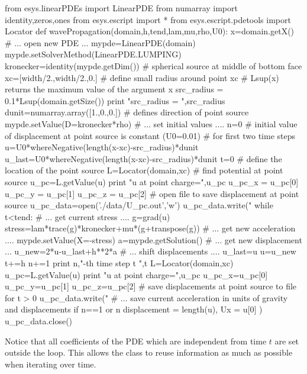 \begin{python}
from esys.linearPDEs import LinearPDE
from numarray import identity,zeros,ones
from esys.escript import *
from esys.escript.pdetools import Locator
def wavePropagation(domain,h,tend,lam,mu,rho,U0):
   x=domain.getX()
   # ... open new PDE ...
   mypde=LinearPDE(domain)
   mypde.setSolverMethod(LinearPDE.LUMPING)
   kronecker=identity(mypde.getDim())
   #  spherical source at middle of bottom face
   xc=[width/2.,width/2.,0.] 
   # define small radius around point xc
   # Lsup(x) returns the maximum value of the argument x
   src_radius = 0.1*Lsup(domain.getSize())
   print "src_radius = ",src_radius
   dunit=numarray.array([1.,0.,0.]) # defines direction of point source
   mypde.setValue(D=kronecker*rho)
   # ... set initial values ....
   n=0
   # initial value of displacement at point source is constant (U0=0.01)
   # for first two time steps
   u=U0*whereNegative(length(x-xc)-src_radius)*dunit
   u_last=U0*whereNegative(length(x-xc)-src_radius)*dunit
   t=0
   # define the location of the point source
   L=Locator(domain,xc)
   # find potential at point source
   u_pc=L.getValue(u)
   print "u at point charge=",u_pc
   u_pc_x = u_pc[0]
   u_pc_y = u_pc[1]
   u_pc_z = u_pc[2]
   # open file to save displacement at point source
   u_pc_data=open('./data/U_pc.out','w')
   u_pc_data.write("%
   while t<tend:
     # ... get current stress ....
     g=grad(u)
     stress=lam*trace(g)*kronecker+mu*(g+transpose(g))
     # ... get new acceleration ....
     mypde.setValue(X=-stress)
     a=mypde.getSolution()
     # ... get new displacement ...
     u_new=2*u-u_last+h**2*a
     # ... shift displacements ....
     u_last=u
     u=u_new
     t+=h
     n+=1
     print n,"-th time step t ",t
     L=Locator(domain,xc)
     u_pc=L.getValue(u)
     print "u at point charge=",u_pc
     u_pc_x=u_pc[0]
     u_pc_y=u_pc[1]
     u_pc_z=u_pc[2]
     # save displacements at point source to file for t > 0
     u_pc_data.write("%
     # ... save current acceleration in units of gravity and displacements
     if n==1 or n%
     displacement = length(u), Ux = u[0] )
   u_pc_data.close()
\end{python}
Notice that 
all coefficients of the PDE which are independent from time $t$ are set outside the  
loop. This allows the \LinearPDE class to reuse information as much as possible 
when iterating over time.  
 
